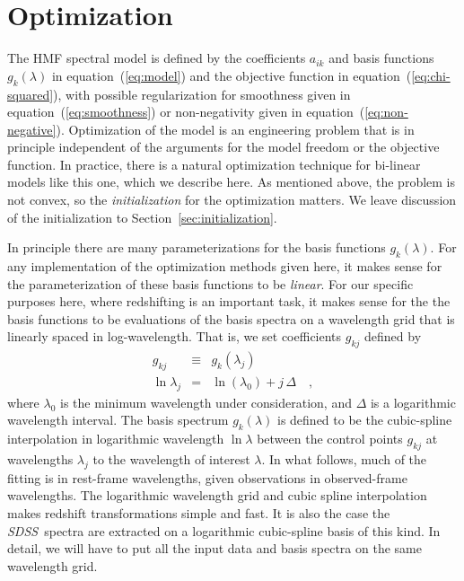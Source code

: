\documentclass[12pt,preprint]{aastex}
\newcommand{\project}[1]{\textsl{#1}}
\newcommand{\sdss}{\project{SDSS}}
\newcommand{\sectionname}{Section}
\newcommand{\equationname}{equation}
\begin{document}
\section{Optimization}\label{sec:optimization}

The HMF spectral model is defined by the coefficients $a_{ik}$ and basis
functions $g_k(\lambda)$ in \equationname~(\ref{eq:model}) and the
objective function in \equationname~(\ref{eq:chi-squared}), with possible
regularization for smoothness given in
\equationname~(\ref{eq:smoothness}) or non-negativity given in
\equationname~(\ref{eq:non-negative}).  Optimization of the model is an
engineering problem that is in principle independent of the arguments
for the model freedom or the objective function.  In practice, there
is a natural optimization technique for bi-linear models like this
one, which we describe here.  As mentioned above, the problem is not
convex, so the \emph{initialization} for the optimization matters.  We
leave discussion of the initialization to
\sectionname~\ref{sec:initialization}.

In principle there are many parameterizations for the basis functions
$g_k(\lambda)$.  For any implementation of the optimization methods
given here, it makes sense for the parameterization of these basis
functions to be \emph{linear}.  For our specific purposes here, where
redshifting is an important task, it makes sense for the the basis
functions to be evaluations of the basis spectra on a wavelength grid
that is linearly spaced in log-wavelength.  That is, we set
coefficients $g_{kj}$ defined by
\begin{eqnarray}\displaystyle
g_{kj} & \equiv & g_k(\lambda_j) \nonumber\\
\ln\lambda_j & = & \ln(\lambda_0) + j\,\Delta
\quad ,
\end{eqnarray}
where $\lambda_0$ is the minimum wavelength under consideration, and
$\Delta$ is a logarithmic wavelength interval.  The basis spectrum
$g_k(\lambda)$ is defined to be the cubic-spline interpolation in
logarithmic wavelength $\ln\lambda$ between the control points
$g_{kj}$ at wavelengths $\lambda_j$ to the wavelength of interest
$\lambda$.  In what follows, much of the fitting is in rest-frame
wavelengths, given observations in observed-frame wavelengths.  The
logarithmic wavelength grid and cubic spline interpolation makes
redshift transformations simple and fast.  It is also the case the
\sdss\ spectra are extracted on a logarithmic cubic-spline basis of
this kind.  In detail, we will have to put all the input data and
basis spectra on the same wavelength grid.
\end{document}
